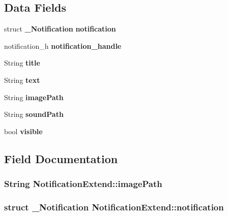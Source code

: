 \subsection*{Data Fields}
\begin{DoxyCompactItemize}
\item 
struct {\bf \-\_\-\-Notification} {\bfseries notification}\label{structNotificationExtend_a38e1711f7cd3c2fc167631b5873b9c5d}

\item 
notification\-\_\-h {\bfseries notification\-\_\-handle}\label{structNotificationExtend_a7bb9c3039ee72189f0c737cff2537562}

\item 
String {\bfseries title}\label{structNotificationExtend_ac61e7d484abd16f74fc77973039744ae}

\item 
String {\bfseries text}\label{structNotificationExtend_a76e3cba8846b22804a1961aceefab4b6}

\item 
String {\bfseries image\-Path}\label{structNotificationExtend_a368dd7698e55dd12d0a9267d893956b3}

\item 
String {\bfseries sound\-Path}\label{structNotificationExtend_a200f522707abb1e267f3fe578e053352}

\item 
bool {\bfseries visible}\label{structNotificationExtend_a231f865350a68814f893279825b0f0f8}

\end{DoxyCompactItemize}


\subsection{Field Documentation}
\subsubsection[{image\-Path}]{\setlength{\rightskip}{0pt plus 5cm}String Notification\-Extend\-::image\-Path}\label{structNotificationExtend_a368dd7698e55dd12d0a9267d893956b3}
\subsubsection[{notification}]{\setlength{\rightskip}{0pt plus 5cm}struct {\bf \-\_\-\-Notification} Notification\-Extend\-::notification}\label{structNotificationExtend_a38e1711f7cd3c2fc167631b5873b9c5d}

